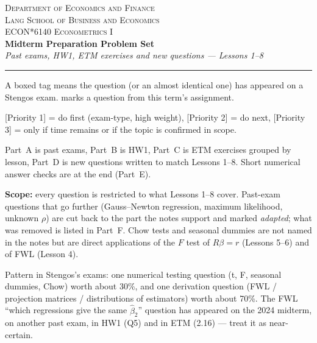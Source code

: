\documentclass[11pt]{article}
\begin{document}
\newcommand{\onexam}[1]{\par\noindent\fbox{\small\textbf{ON PAST EXAM}~--- #1}\par\smallskip}
\newcommand{\onhw}[1]{\par\noindent\fbox{\small\textbf{IN HW1}~--- #1}\par\smallskip}
\newcommand{\src}[1]{\par\noindent{\small\textsf{Source: #1}}\par\smallskip}
\newcommand{\pri}[1]{\textsf{[Priority #1]}}

\begin{center}
  {\footnotesize\scshape Department of Economics and Finance\\
   Lang School of Business and Economics}\\[5pt]
  {\large\scshape ECON*6140 Econometrics I}\\[3pt]
  {\LARGE\bfseries Midterm Preparation Problem Set}\\[4pt]
  {\itshape Past exams, HW1, ETM exercises and new questions --- Lessons 1--8}
\end{center}
\vspace{0.4em}\hrule\vspace{0.9em}

\begin{flatlist}
  \item A boxed  tag means the question (or an
        almost identical one) has appeared on a Stengos exam. 
        marks a question from this term's assignment.
  \item \pri{1} = do first (exam-type, high weight), \pri{2} = do next,
        \pri{3} = only if time remains or if the topic is confirmed in scope.
  \item Part~A is past exams, Part~B is HW1, Part~C is ETM exercises grouped by
        lesson, Part~D is new questions written to match Lessons 1--8.
        Short numerical answer checks are at the end (Part~E).
  \item \textbf{Scope:} every question is restricted to what Lessons 1--8 cover.
        Past-exam questions that go further (Gauss--Newton regression, maximum
        likelihood, unknown $\rho$) are cut back to the part the notes support and
        marked \emph{adapted}; what was removed is listed in Part~F. Chow tests and
        seasonal dummies are not named in the notes but are direct applications of
        the $F$ test of $R\beta = r$ (Lessons 5--6) and of FWL (Lesson 4).
  \item Pattern in Stengos's exams: one numerical testing question (t, F,
        seasonal dummies, Chow) worth about 30\%, and one derivation question
        (FWL / projection matrices / distributions of estimators) worth about 70\%.
        The FWL ``which regressions give the same $\hat\beta_{2}$'' question has
        appeared on the 2024 midterm, on another past exam, in HW1 (Q5) and in
        ETM (2.16) --- treat it as near-certain.
\end{flatlist}
\end{document}
